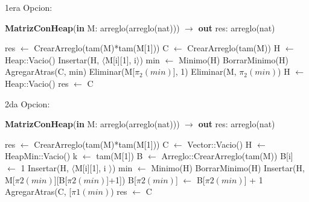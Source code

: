 1era Opcion:

\begin{algorithm}[H]
\caption{
    \textbf{MatrizConHeap}(\textbf{in} M: arreglo(arreglo(nat))) $\to$ \textbf{out} res: arreglo(nat)
}
    \begin{algorithmic}[1]
        \State res $\gets$ CrearArreglo(tam(M)*tam(M[1])) 
        \State C $\gets$ CrearArreglo(tam(M)) 
        \State H $\gets$ Heap::Vacio() 
         
             
                \State Insertar(H, $\langle$M[i][1], i$\rangle$)
            \EndFor
            \State min $\gets$ Minimo(H) 
            \State BorrarMinimo(H) 
            \State AgregarAtras(C, min) 
            \State Eliminar(M[$\pi_{2}(min)$], 1) 
                \State Eliminar(M, $\pi_{2}(min)$) 
            \EndIf
            \State H $\gets$ Heap::Vacio() 
        \EndWhile
        \State res $\gets$ C
    \end{algorithmic}
\end{algorithm}

2da Opcion:
\begin{algorithm}[H]
\caption{
    \textbf{MatrizConHeap}(\textbf{in} M: arreglo(arreglo(nat))) $\to$ \textbf{out} res: arreglo(nat)
}
    \begin{algorithmic}[1]
        \State res $\gets$ CrearArreglo(tam(M)*tam(M[1])) 
        \State C $\gets$ Vector::Vacio() 
        \State H $\gets$ HeapMin::Vacio() 
        \State k $\gets$ tam(M[1]) 
        \State B $\gets$ Arreglo::CrearArreglo(tam(M)) 
         
            \State B[i] $\gets$ 1
        \EndFor
         
            \State Insertar(H, $\langle$M[i][1], i $\rangle$)
        \EndFor
         
           \State min $\gets$ Minimo(H) 
           \State BorrarMinimo(H) 
                \State Insertar(H, M[$\pi{2}(min)$][B[$\pi{2}(min)$]+1])  
                \State B[$\pi{2}(min)$] $\gets$ B[$\pi{2}(min)$] + 1 
            \EndIf
            \State AgregarAtras(C, [$\pi{1}(min)$) 
        \EndWhile
        \State res $\gets$ C
    \end{algorithmic}
\end{algorithm}